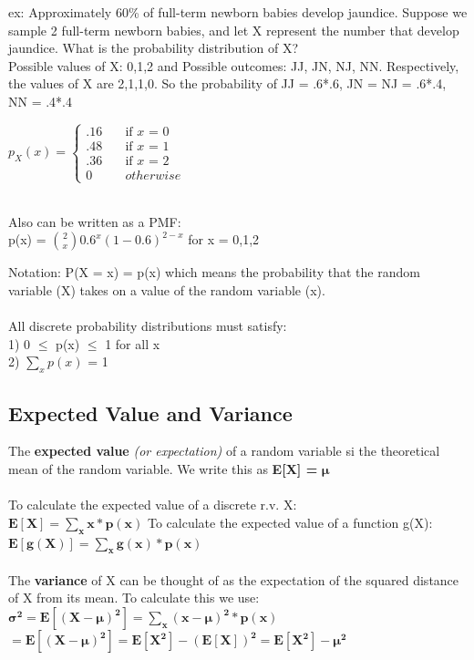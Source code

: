 \documentclass[12pt, a4paper]{article}
\begin{document}
	\noindent ex: Approximately 60\% of full-term newborn babies develop jaundice. Suppose we sample 2 full-term newborn babies, and let X represent the number that develop jaundice. What is the probability distribution of X? \\
	Possible values of X: 0,1,2 and Possible outcomes: JJ, JN, NJ, NN. Respectively, the values of X are 2,1,1,0. So the probability of JJ = .6*.6, JN = NJ = .6*.4, NN = .4*.4
	\begin{minipage}[c]{7cm}
		$ p_X(x) =
		\begin{cases}
		.16   & \quad \text{if } x \text{ = 0}\\
		.48   & \quad \text{if } x \text{ = 1}\\
		.36   & \quad \text{if } x \text{ = 2}\\
		0	  & \quad {otherwise}
		\end{cases}$ \\~\\
	\end{minipage}
	\begin{minipage}[c]{7cm}
		Also can be written as a PMF: \\
		p(x) = $\binom{2}{x}0.6^x(1-0.6)^{2-x}$ for x = 0,1,2 \\
	\end{minipage}
	
	\noindent Notation: P(X = x) = p(x) which means the probability that the random variable (X) takes on a value of the random variable (x). \\~\\
	All discrete probability distributions must satisfy: \\
	1) 0 $\leq$ p(x) $\leq$ 1 for all x \\
	2) $\sum_{x}p(x)$ = 1 \\
	
	\subsection{Expected Value and Variance}
	The \textbf{expected value} \textit{(or expectation)} of a random variable si the theoretical mean of the random variable. We write this as \textbf{E[X] =} $\mathbf{\mu}$\\~\\
	To calculate the expected value of a discrete r.v. X: \\
	$\mathbf{E[X] = \sum_{x}x*p(x)}$ \newpage
	\noindent To calculate the expected value of a function g(X): \\
	$\mathbf{E[g(X)] = \sum_{x} g(x)*p(x)}$ \\~\\
	The \textbf{variance} of X can be thought of as the expectation of the squared distance of X from its mean. To calculate this we use: \\
	$\mathbf{\sigma^2 = E[(X - \mu)^2] = \sum_{x}(x-\mu)^2*p(x)}$ \\
	\hspace*{5.5mm}$\mathbf{= E[(X - \mu)^2] = E[X^2] - (E[X])^2 = E[X^2] - \mu^2}$ \\
	
\end{document}
